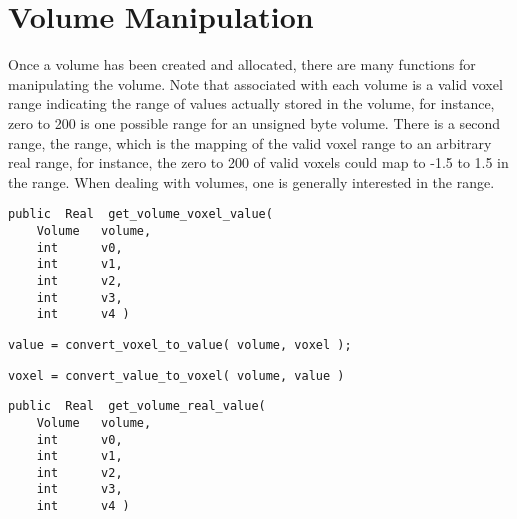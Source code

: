 \section{Volume Manipulation}

Once a volume has been created and allocated, there are many
functions for manipulating the volume.  Note that associated with
each volume is a valid voxel range indicating the range of values
actually stored in the volume, for instance, zero to 200 is one
possible range for an unsigned byte volume.  There is a second range,
the  range, which is the mapping of the valid voxel range
to an arbitrary real range, for instance, the zero to 200 of valid
voxels could map to -1.5 to 1.5 in the  range.  When
dealing with volumes, one is generally interested in the 
range.

{\bf\begin{verbatim}
public  Real  get_volume_voxel_value(
    Volume   volume,
    int      v0,
    int      v1,
    int      v2,
    int      v3,
    int      v4 )
\end{verbatim}}


{\bf\begin{verbatim}
value = convert_voxel_to_value( volume, voxel );
\end{verbatim}}


{\bf\begin{verbatim}
voxel = convert_value_to_voxel( volume, value )
\end{verbatim}}


{\bf\begin{verbatim}
public  Real  get_volume_real_value(
    Volume   volume,
    int      v0,
    int      v1,
    int      v2,
    int      v3,
    int      v4 )
\end{verbatim}}


